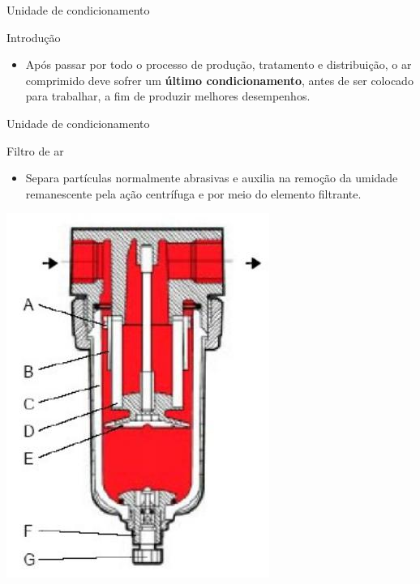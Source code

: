 \begin{frame}{Unidade de condicionamento}
	\begin{block}{Introdução}
		\begin{itemize}
			\item Após passar por todo o processo de produção, tratamento e distribuição, o ar comprimido deve sofrer um \textbf{último condicionamento}, antes de ser colocado para trabalhar, a fim de produzir melhores desempenhos.
		\end{itemize}
	\end{block}
	
	
\end{frame}


\begin{frame}{Unidade de condicionamento}
	\begin{block}{Filtro de ar}
		\begin{itemize}
			\item Separa partículas normalmente abrasivas e auxilia na remoção da umidade remanescente pela ação centrífuga e por meio do elemento filtrante.
		\end{itemize}
	\end{block}

	\centering
	\includegraphics[height=0.6\textheight]{Figuras/Ch13/fig16}
	
\end{frame}


